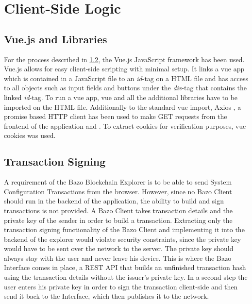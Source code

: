 \section{Client-Side Logic} \label{sec:clientside}

\subsection{Vue.js and Libraries} \label{vuejs}
For the process described in \ref{txsigning}, the Vue.js JavaScript framework \cite{vue} has been used. Vue.js allows for easy client-side scripting with minimal setup. It links a vue app which is contained in a JavaScript file to an \emph{id}-tag on a HTML file and has access to all objects such as input fields and buttons under the \emph{div}-tag that contains the linked  \emph{id}-tag. To run a vue app, vue and all the additional libraries have to be imported on the HTML file. Additionally to the standard vue import, Axios , a promise based HTTP client \cite{axios} has been used to make GET requests from the frontend of the application and . To extract cookies for verification purposes, vue-cookies \cite{vcookies} was used. 

\subsection{Transaction Signing} \label{txsigning}
A requirement of the Bazo Blockchain Explorer is to be able to send System Configuration Transactions from the browser. 
However, since no Bazo Client should run in the backend of the application, the ability to build and sign transactions is not provided. A Bazo Client takes transaction details and the private key of the sender in order to build a transaction. Extracting only the transaction signing functionality of the Bazo Client and implementing it into the backend of the explorer would violate security constraints, since the private key would have to be sent over the network to the server. The private key should always stay with the user and never leave his device. This is where the Bazo Interface \cite{marc} comes in place, a REST API that builds an unfinished transaction hash using the transaction details without the issuer's private key. In a second step the user enters his private key in order to sign the transaction client-side and then send it back to the Interface, which then publishes it to the network.

